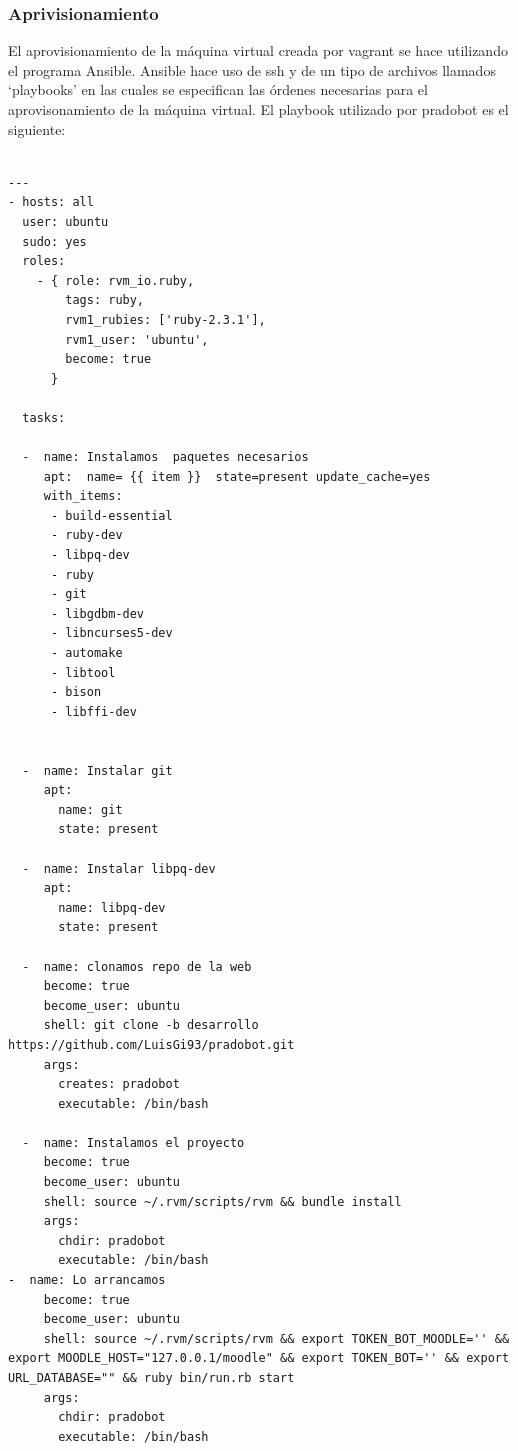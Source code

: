 \subsubsection{Aprivisionamiento}

El aprovisionamiento de la máquina virtual creada por vagrant se hace utilizando el programa Ansible. Ansible hace uso de ssh y de un tipo de archivos llamados \enquote*{playbooks} en las cuales se especifican las órdenes necesarias para el aprovisonamiento de la máquina virtual. El playbook utilizado por pradobot es el siguiente:
\begin{lstlisting}

---
- hosts: all
  user: ubuntu
  sudo: yes    
  roles:
    - { role: rvm_io.ruby,
        tags: ruby,
        rvm1_rubies: ['ruby-2.3.1'],
        rvm1_user: 'ubuntu',
        become: true
      }
      
  tasks:       

  -  name: Instalamos  paquetes necesarios
     apt:  name= {{ item }}  state=present update_cache=yes
     with_items:
      - build-essential
      - ruby-dev
      - libpq-dev
      - ruby
      - git
      - libgdbm-dev
      - libncurses5-dev
      - automake
      - libtool
      - bison
      - libffi-dev


  -  name: Instalar git
     apt:  
       name: git
       state: present
      
  -  name: Instalar libpq-dev
     apt:  
       name: libpq-dev
       state: present

  -  name: clonamos repo de la web
     become: true  
     become_user: ubuntu
     shell: git clone -b desarrollo https://github.com/LuisGi93/pradobot.git
     args:
       creates: pradobot
       executable: /bin/bash

  -  name: Instalamos el proyecto
     become: true  
     become_user: ubuntu 
     shell: source ~/.rvm/scripts/rvm && bundle install 
     args:
       chdir: pradobot
       executable: /bin/bash
-  name: Lo arrancamos
     become: true  
     become_user: ubuntu
     shell: source ~/.rvm/scripts/rvm && export TOKEN_BOT_MOODLE='' && export MOODLE_HOST="127.0.0.1/moodle" && export TOKEN_BOT='' && export URL_DATABASE="" && ruby bin/run.rb start
     args:
       chdir: pradobot
       executable: /bin/bash
\end{lstlisting}

